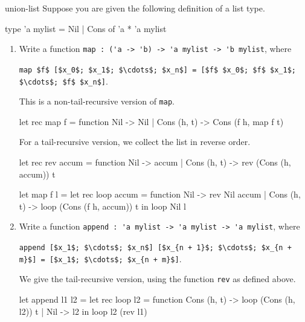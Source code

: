 %
%
%
\exercises

%
\begin{exercise}{union-list}
Suppose you are given the following definition of a list type.

\begin{ocaml}
type 'a mylist = Nil | Cons of 'a * 'a mylist
\end{ocaml}

\begin{enumerate}
\item Write a function \hbox{\lstinline/map : ('a -> 'b) -> 'a mylist -> 'b mylist/}, where

\lstinline!map $f$ [$x_0$; $x_1$; $\cdots$; $x_n$] = [$f$ $x_0$; $f$ $x_1$; $\cdots$; $f$ $x_n$]!.

\begin{answer}\ifanswers
This is a non-tail-recursive version of \hbox{\lstinline/map/}.

\begin{ocaml}
let rec map f = function
   Nil -> Nil
 | Cons (h, t) -> Cons (f h, map f t)
\end{ocaml}
%
For a tail-recursive version, we collect the list in reverse order.

\begin{ocaml}
let rec rev accum = function
   Nil -> accum
 | Cons (h, t) -> rev (Cons (h, accum)) t

let map f l =
   let rec loop accum = function
      Nil -> rev Nil accum
    | Cons (h, t) -> loop (Cons (f h, accum)) t
   in
      loop Nil l
\end{ocaml}
\fi\end{answer}

\item Write a function \hbox{\lstinline/append : 'a mylist -> 'a mylist -> 'a mylist/}, where

\lstinline!append [$x_1$; $\cdots$; $x_n$] [$x_{n + 1}$; $\cdots$; $x_{n + m}$] = [$x_1$; $\cdots$; $x_{n + m}$]!.

\begin{answer}\ifanswers
We give the tail-recursive version, using the function \hbox{\lstinline/rev/} as defined above.
\begin{ocaml}
let append l1 l2 =
   let rec loop l2 = function
      Cons (h, t) -> loop (Cons (h, l2)) t
    | Nil -> l2
   in
      loop l2 (rev l1)
\end{ocaml}
\fi\end{answer}
\end{enumerate}
\end{exercise}

